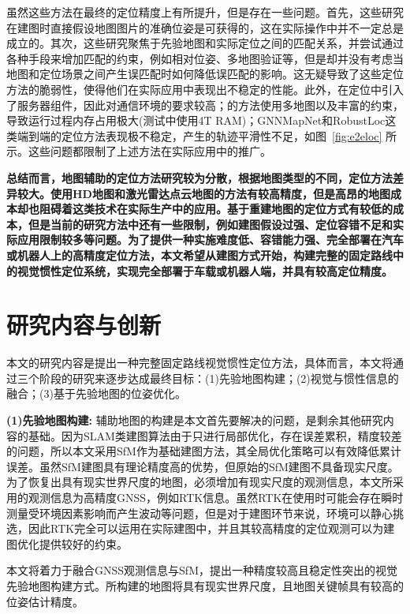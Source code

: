 虽然这些方法在最终的定位精度上有所提升，但是存在一些问题。首先，这些研究在建图时直接假设地图图片的准确位姿是可获得的，这在实际操作中并不一定总是成立的。其次，这些研究聚焦于先验地图和实际定位之间的匹配关系，并尝试通过各种手段来增加匹配的约束，例如相对位姿、多地图验证等，但是却并没有考虑当地图和定位场景之间产生误匹配时如何降低误匹配的影响。这无疑导致了这些定位方法的脆弱性，使得他们在实际应用中表现出不稳定的性能。此外，\citet{yang2022real}在定位中引入了服务器组件，因此对通信环境的要求较高；\citet{lin2023visual}的方法使用多地图以及丰富的约束，导致运行过程内存占用极大(测试中使用4T RAM)；GNNMapNet和RobustLoc这类端到端的定位方法表现极不稳定，产生的轨迹平滑性不足，如图~\ref{fig:e2eloc} 所示。这些问题都限制了上述方法在实际应用中的推广。

\textbf{总结而言，地图辅助的定位方法研究较为分散，根据地图类型的不同，定位方法差异较大。使用HD地图和激光雷达点云地图的方法有较高精度，但是高昂的地图成本却也阻碍着这类技术在实际生产中的应用。基于重建地图的定位方式有较低的成本，但是当前的研究方法中还有一些限制，例如建图假设过强、定位容错不足和实际应用限制较多等问题。为了提供一种实施难度低、容错能力强、完全部署在汽车或机器人上的高精度定位方法，本文希望从建图方式开始，构建完整的固定路线中的视觉惯性定位系统，实现完全部署于车载或机器人端，并具有较高定位精度。}


\section{研究内容与创新}

本文的研究内容是提出一种完整固定路线视觉惯性定位方法，具体而言，本文将通过三个阶段的研究来逐步达成最终目标：(1)先验地图构建；(2)视觉与惯性信息的融合；(3)基于先验地图的位姿优化。


\textbf{(1)先验地图构建:}
辅助地图的构建是本文首先要解决的问题，是剩余其他研究内容的基础。因为SLAM类建图算法由于只进行局部优化，存在误差累积，精度较差的问题，所以本文采用SfM作为基础建图方法，其全局优化策略可以有效降低累计误差。虽然SfM建图具有理论精度高的优势，但原始的SfM建图不具备现实尺度。为了恢复出具有现实世界尺度的地图，必须增加有现实尺度的观测信息，本文所采用的观测信息为高精度GNSS，例如RTK信息。虽然RTK在使用时可能会存在瞬时测量受环境因素影响而产生波动等问题，但是对于建图环节来说，环境可以静心挑选，因此RTK完全可以运用在实际建图中，并且其较高精度的定位观测可以为建图优化提供较好的约束。

本文将着力于融合GNSS观测信息与SfM，提出一种精度较高且稳定性突出的视觉先验地图构建方式。所构建的地图将具有现实世界尺度，且地图关键帧具有较高的位姿估计精度。

